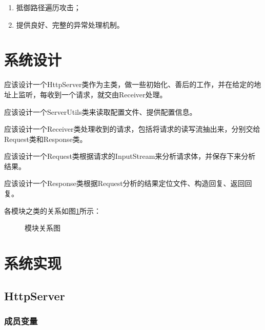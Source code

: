 \documentclass[UTF8,12pt]{ctexart}
\begin{document}
\begin{enumerate}
	\item 抵御路径遍历攻击；
	\item 提供良好、完整的异常处理机制。
\end{enumerate}

\section{系统设计}

应该设计一个HttpServer类作为主类，做一些初始化、善后的工作，并在给定的地址上监听，每收到一个请求，就交由Receiver处理。

应该设计一个ServerUtils类来读取配置文件、提供配置信息。

应该设计一个Receiver类处理收到的请求，包括将请求的读写流抽出来，分别交给Request类和Response类。

应该设计一个Request类根据请求的InputStream来分析请求体，并保存下来分析结果。

应该设计一个Response类根据Request分析的结果定位文件、构造回复、返回回复。

各模块之类的关系如图\ref{fig1}所示：


\begin{figure}[htbp]
	\centering
	\caption{模块关系图} \label{fig1}
\end{figure}
\section{系统实现}

\subsection{HttpServer}

\subsubsection{成员变量}
\end{document}
